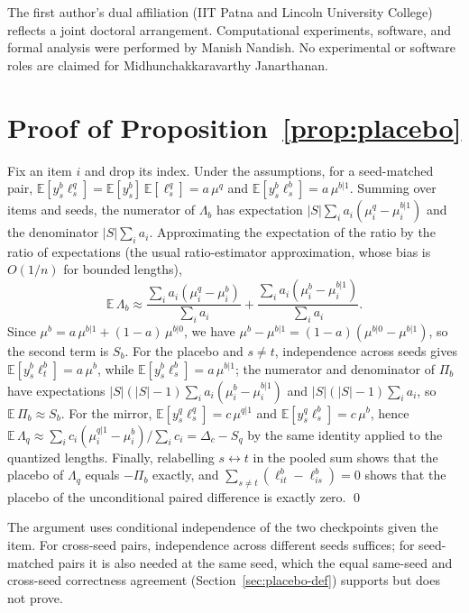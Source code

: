 \documentclass[11pt,a4paper]{article}
\begin{document}
The first author's dual affiliation (IIT Patna and Lincoln University College) reflects a joint doctoral arrangement. Computational experiments, software, and formal analysis were performed by Manish Nandish. No experimental or software roles are claimed for Midhunchakkaravarthy Janarthanan.




\clearpage
\appendix

\section{Proof of Proposition~\ref{prop:placebo}}
\label{app:proof}
Fix an item $i$ and drop its index. Under the assumptions, for a seed-matched pair, $\mathbb{E}[y^b_{s}\ell^q_{s}]=\mathbb{E}[y^b_s]\,\mathbb{E}[\ell^q_s]=a\,\mu^q$ and $\mathbb{E}[y^b_s\ell^b_s]=a\,\mu^{b|1}$. Summing over items and seeds, the numerator of $\Lambda_b$ has expectation $|S|\sum_i a_i(\mu^q_i-\mu^{b|1}_i)$ and the denominator $|S|\sum_i a_i$. Approximating the expectation of the ratio by the ratio of expectations (the usual ratio-estimator approximation, whose bias is $O(1/n)$ for bounded lengths),
\[
\mathbb{E}\,\Lambda_b\approx\frac{\sum_i a_i(\mu^q_i-\mu^{b}_i)}{\sum_i a_i}+\frac{\sum_i a_i(\mu^b_i-\mu^{b|1}_i)}{\sum_i a_i}.
\]
Since $\mu^b=a\,\mu^{b|1}+(1-a)\,\mu^{b|0}$, we have $\mu^b-\mu^{b|1}=(1-a)(\mu^{b|0}-\mu^{b|1})$, so the second term is $S_b$. For the placebo and $s\neq t$, independence across seeds gives $\mathbb{E}[y^b_s\ell^b_t]=a\,\mu^b$, while $\mathbb{E}[y^b_s\ell^b_s]=a\,\mu^{b|1}$; the numerator and denominator of $\Pi_b$ have expectations $|S|(|S|-1)\sum_i a_i(\mu^b_i-\mu^{b|1}_i)$ and $|S|(|S|-1)\sum_i a_i$, so $\mathbb{E}\,\Pi_b\approx S_b$. For the mirror, $\mathbb{E}[y^q_s\ell^q_s]=c\,\mu^{q|1}$ and $\mathbb{E}[y^q_s\ell^b_s]=c\,\mu^b$, hence $\mathbb{E}\,\Lambda_q\approx\sum_i c_i(\mu^{q|1}_i-\mu^b_i)/\sum_i c_i=\Delta_c-S_q$ by the same identity applied to the quantized lengths. Finally, relabelling $s\leftrightarrow t$ in the pooled sum shows that the placebo of $\Lambda_q$ equals $-\Pi_b$ exactly, and $\sum_{s\neq t}(\ell^b_{it}-\ell^b_{is})=0$ shows that the placebo of the unconditional paired difference is exactly zero. \qed

The argument uses conditional independence of the two checkpoints given the item. For cross-seed pairs, independence across different seeds suffices; for seed-matched pairs it is also needed at the same seed, which the equal same-seed and cross-seed correctness agreement (Section~\ref{sec:placebo-def}) supports but does not prove.
\end{document}
